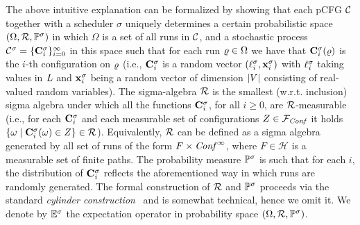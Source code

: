 The above intuitive explanation can be formalized by showing that
each pCFG $\mathcal{C}$ together with a scheduler $\sigma$ uniquely determines a 
certain 
probabilistic 
space $(\Omega,\mathcal{R},\mathbb{P}^{\sigma})$ in which $\Omega$ is a set of all 
runs in $\mathcal{C}$, and a stochastic process 
$\mathcal{C}^{\sigma}=\{\mathbf{C}^{\sigma}_{i}\}_{i=0}^{\infty}$ in this space 
such 
that for each run $\varrho\in \Omega$ we have that $\mathbf{C}^{\sigma}_{i}(\varrho)$ is the 
$i$-th configuration on $\varrho$ (i.e., $\mathbf{C}^{\sigma}_{i}$ is a random vector 
$(\ell^{\sigma}_{i},\mathbf{x}^{\sigma}_{i})$ with  $\ell^{\sigma}_{i}$ taking 
values in $\mathit{L}$ and $\mathbf{x}^{\sigma}_{i}$ being a random vector of dimension 
$|V|$ consisting of real-valued random variables). The sigma-algebra 
$\mathcal{R}$ is the smallest (w.r.t. inclusion) sigma algebra under which all 
the functions $\mathbf{C}^{\sigma}_{i}$, for all $i\geq 0$, 
are $\mathcal{R}$-measurable (i.e., for each $\mathbf{C}^{\sigma}_{i}$ and each measurable 
set of configurations $Z\in\mathcal{F}_{\mathit{Conf}}$ it holds 
$\{\omega\mid\mathbf{C}^{\sigma}_{i}(\omega)\in Z\}\in \mathcal{R}$). Equivalently, 
$\mathcal{R}$ can be defined as a sigma algebra generated by all set of runs of 
the form $F\times \mathit{Conf}^{\infty}$, where $F\in \mathcal{H}$ is a measurable set 
of finite paths. The 
probability 
measure 
$\mathbb{P}^{\sigma}$ is such that for each $i$, the distribution of 
$\mathbf{C}^{\sigma}_{i}$ reflects the aforementioned way in which runs are randomly 
generated. The formal construction 
of $\mathcal{R}$ and $\mathbb{P}^{\sigma}$ proceeds via the standard \emph{cylinder 
construction}~\cite[Theorem 2.7.2]{Ash:book} and is
somewhat 
technical, hence we omit it. 
We denote by $\mathbb{E}^\sigma$ the expectation operator in probability space 
$(\Omega,\mathcal{R},\mathbb{P}^{\sigma})$.
 

%


